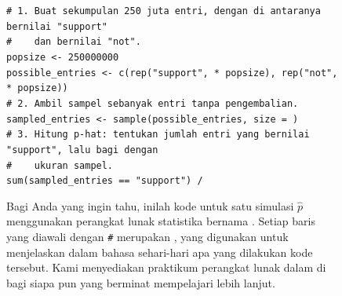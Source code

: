 \begin{figure}[h]
\texttt{\# 1.\ Buat sekumpulan 250 juta entri,
dengan \pewsolarparpercent{} di antaranya bernilai "support" \\
\#\ \ \ \ dan \pewsolarparpercentcomplement{} bernilai "not". \\
pop\us{}size <- 250000000 \\
possible\_entries <- c(rep("support", \pewsolarparprop{} * pop\us{}size), rep("not", \pewsolarparpropcomplement{} * pop\us{}size))
\\[3mm]
\# 2.\ Ambil sampel sebanyak \pewsolarpollsize{} entri tanpa pengembalian. \\
sampled\_entries <- sample(possible\_entries, size = \pewsolarpollsize{}) \\[3mm]
\# 3.\ Hitung p-hat:~tentukan jumlah entri yang bernilai "support",
lalu bagi dengan \\
\#\ \ \ \ ukuran sampel. \\
sum(sampled\_entries == "support") / \pewsolarpollsize{}}
\caption{Bagi Anda yang ingin tahu, inilah kode untuk
    satu simulasi $\hat{p}$ menggunakan
    perangkat lunak statistika bernama \R{}.
    Setiap baris yang diawali dengan \texttt{\#} merupakan
    ,
    yang digunakan untuk menjelaskan dalam bahasa sehari-hari apa yang
    dilakukan kode tersebut.
    Kami menyediakan praktikum perangkat lunak dalam \R{} di
    bagi siapa pun yang berminat mempelajari lebih lanjut.}
\label{solarPollSimulationCodeR}
\end{figure}


